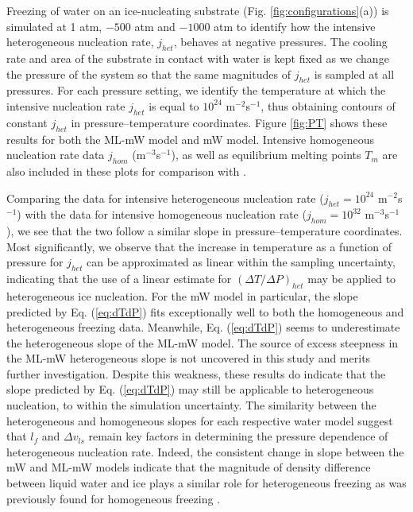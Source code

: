 \documentclass[journal abbreviation, manuscript]{copernicus}
\begin{document}
Freezing of water on an ice-nucleating substrate (Fig. \ref{fig:configurations}(a)) is simulated at 1 atm, $-500$ atm and $-1000$ atm to identify how the intensive heterogeneous nucleation rate, $j_{het}$, behaves at negative pressures. The cooling rate and area of the substrate in contact with water is kept fixed as we change the pressure of the system so that the same magnitudes of $j_{het}$ is sampled at all pressures. For each pressure setting, we identify the temperature at which the intensive nucleation rate $j_{het}$ is equal to $10^{24}$ m$^{-2}$s$^{-1}$, thus obtaining contours of constant $j_{het}$ in pressure--temperature coordinates. Figure \ref{fig:PT} shows these results for both the ML-mW model and mW model. Intensive homogeneous nucleation rate data $j_{hom}$ (m$^{-3}$s$^{-1}$), as well as equilibrium melting points $T_m$ are also included in these plots for comparison with \citet{rosky2022}. 

Comparing the data for intensive heterogeneous nucleation rate ($j_{het} = 10^{24}$ m$^{-2}$s$^{-1}$) with the data for intensive homogeneous nucleation rate ($j_{hom} = 10^{32}$ m$^{-3}$s$^{-1}$), we see that the two follow a similar slope in pressure--temperature coordinates. Most significantly, we observe that the increase in temperature as a function of pressure for $j_{het}$ can be approximated as linear within the sampling uncertainty, indicating that the use of a linear estimate for $(\Delta T/\Delta P)_{het}$ may be applied to heterogeneous ice nucleation. For the mW model in particular, the slope predicted by Eq. (\ref{eq:dTdP}) fits exceptionally well to both the homogeneous and heterogeneous freezing data. Meanwhile, Eq. (\ref{eq:dTdP}) seems to underestimate the heterogeneous slope of the ML-mW model. The source of excess steepness in the ML-mW heterogeneous slope is not uncovered in this study and merits further investigation. Despite this weakness, these results do indicate that the slope predicted by Eq. (\ref{eq:dTdP}) may still be applicable to heterogeneous nucleation, to within the simulation uncertainty. The similarity between the heterogeneous and homogeneous slopes for each respective water model suggest that $l_f$ and $\Delta v_{ls}$ remain key factors in determining the pressure dependence of heterogeneous nucleation rate. Indeed, the consistent change in slope between the mW and ML-mW models indicate that the magnitude of density difference between liquid water and ice plays a similar role for heterogeneous freezing as was previously found for homogeneous freezing \citep{rosky2022}.
\end{document}
